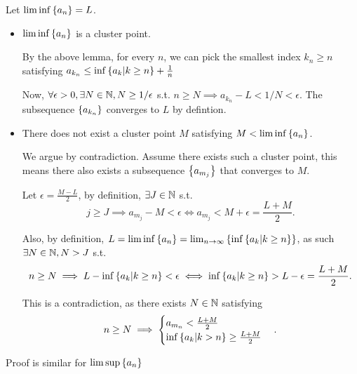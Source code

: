 \noindent Let $\liminf\left\{a_n\right\} = L$.
\begin{itemize}
    \item $\liminf\left\{a_n\right\}$ is a cluster point.
    
    By the above lemma, for every $n$, we can pick the smallest index $k_n \geq n$ satisfying $a_{k_n} \leq \inf\left\{a_k | k \geq n\right\} + \frac{1}{n}$
    
    Now, $\forall \epsilon > 0, \exists N \in \mathbb{N}, N\geq 1/\epsilon$ s.t. $n \geq N \implies a_{k_n} - L < 1/N < \epsilon.$
    The subsequence $\left\{a_{k_n}\right\}$ converges to $L$ by defintion.
    
    \item There does not exist a cluster point $M$ satisfying $M < \liminf\left\{a_n\right\}$.
    
    We argue by contradiction. Assume there exists such a cluster point, this means there also exists a subsequence $\left\{a_{m_j}\right\}$ that converges to $M$.

    Let $\epsilon = \frac{M-L}{2}$, by definition, $\exists J \in \mathbb{N}$ s.t. 
    \[j \geq J \implies a_{m_j} - M < \epsilon \iff a_{m_j} < M + \epsilon = \frac{L+M}{2}.\]

    Also, by definition, $L = \liminf\left\{a_n\right\} = \lim_{n\to\infty} \left\{\inf\left\{a_k | k \geq n\right\}\right\}$, as such $\exists N \in \mathbb{N}, N > J$ s.t. 
    \[n \geq N \implies L - \inf\left\{a_k | k \geq n\right\} < \epsilon \iff \inf\left\{a_k | k \geq n\right\} > L - \epsilon = \frac{L + M}{2}.\]

    This is a contradiction, as there exists $N \in \mathbb{N}$ satisfying
    \[ n \geq N \implies \begin{cases}
        a_{m_n} < \frac{L+M}{2} \\ \inf\left\{a_k | k > n\right\} \geq \frac{L+M}{2}
    \end{cases}.\]
\end{itemize}
Proof is similar for $\limsup\left\{a_n\right\}$


